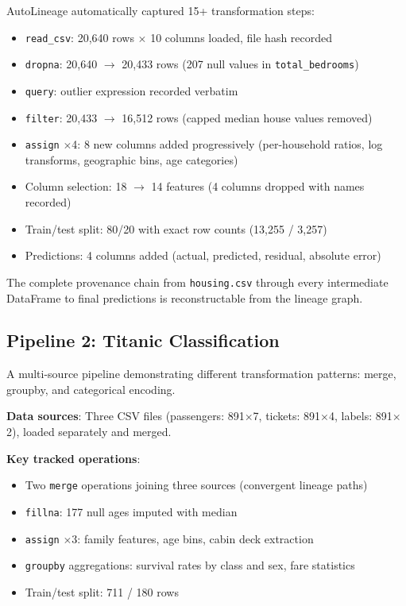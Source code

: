 \documentclass[10pt,twocolumn]{article}
\begin{document}
AutoLineage automatically captured 15+ transformation steps:

\begin{itemize}[leftmargin=*, nosep]
  \item \texttt{read\_csv}: 20,640 rows $\times$ 10 columns loaded, file hash recorded
  \item \texttt{dropna}: 20,640 $\to$ 20,433 rows (207 null values in \texttt{total\_bedrooms})
  \item \texttt{query}: outlier expression recorded verbatim
  \item \texttt{filter}: 20,433 $\to$ 16,512 rows (capped median house values removed)
  \item \texttt{assign} $\times$4: 8 new columns added progressively (per-household ratios, log transforms, geographic bins, age categories)
  \item Column selection: 18 $\to$ 14 features (4 columns dropped with names recorded)
  \item Train/test split: 80/20 with exact row counts (13,255 / 3,257)
  \item Predictions: 4 columns added (actual, predicted, residual, absolute error)
\end{itemize}

The complete provenance chain from \texttt{housing.csv} through every intermediate DataFrame to final predictions is reconstructable from the lineage graph.

\subsection{Pipeline 2: Titanic Classification}
\label{sec:pipeline2}

A multi-source pipeline demonstrating different transformation patterns: merge, groupby, and categorical encoding.

\textbf{Data sources}: Three CSV files (passengers: 891$\times$7, tickets: 891$\times$4, labels: 891$\times$2), loaded separately and merged.

\textbf{Key tracked operations}:
\begin{itemize}[leftmargin=*, nosep]
  \item Two \texttt{merge} operations joining three sources (convergent lineage paths)
  \item \texttt{fillna}: 177 null ages imputed with median
  \item \texttt{assign} $\times$3: family features, age bins, cabin deck extraction
  \item \texttt{groupby} aggregations: survival rates by class and sex, fare statistics
  \item Train/test split: 711 / 180 rows
\end{itemize}
\end{document}
